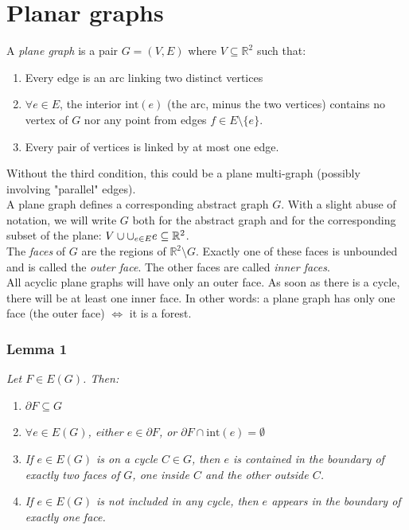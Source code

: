 
\chapter{Planar graphs}
		A \textit{plane graph} is a pair $G = (V,E)$ where $V \subseteq \mathbb{R}^2$ such that:
		\begin{enumerate}
			\item Every edge is an arc linking two distinct vertices
			\item $\forall e \in E$, the interior $\text{int}(e)$ (the arc, minus the two vertices) contains no vertex of $G$ nor any point from edges $f \in E \setminus \{ e \}$.
			\item Every pair of vertices is linked by at most one edge.
		\end{enumerate}
		Without the third condition, this could be a plane multi-graph (possibly involving "parallel" edges).\\
		
		A plane graph defines a corresponding abstract graph $G$. With a slight abuse of notation, we will write $G$ both for the abstract graph and for the corresponding subset of the plane: $V \cup \Large{\cup_{e \in E}} e \subseteq \mathbb{R}^2$.\\
		
		The \textit{faces} of $G$ are the regions of $\mathbb{R}^2 \setminus G$. Exactly one of these faces is unbounded and is called the \textit{outer face}. The other faces are called \textit{inner faces}. \\
		
		All acyclic plane graphs will have only an outer face. As soon as there is a cycle, there will be at least one inner face. In other words: a plane graph has only one face (the outer face) $\iff$ it is a forest. 
		
		\subsection{Lemma 1} 
		\textit{Let $F \in E(G)$. Then:}
		\begin{enumerate}
			\item $\partial F \subseteq G$
			\item \textit{$\forall e \in E(G)$, either $e \in \partial F$, or $\partial F \cap \text{int}(e) = \emptyset$}
			\item \textit{If $e \in E(G)$ is on a cycle $C \in G$, then $e$ is contained in the boundary of exactly two faces of $G$, one inside $C$ and the other outside $C$.}
			\item \textit{If $e \in E(G)$ is not included in any cycle, then $e$ appears in the boundary of exactly one face.}
		\end{enumerate}
		
